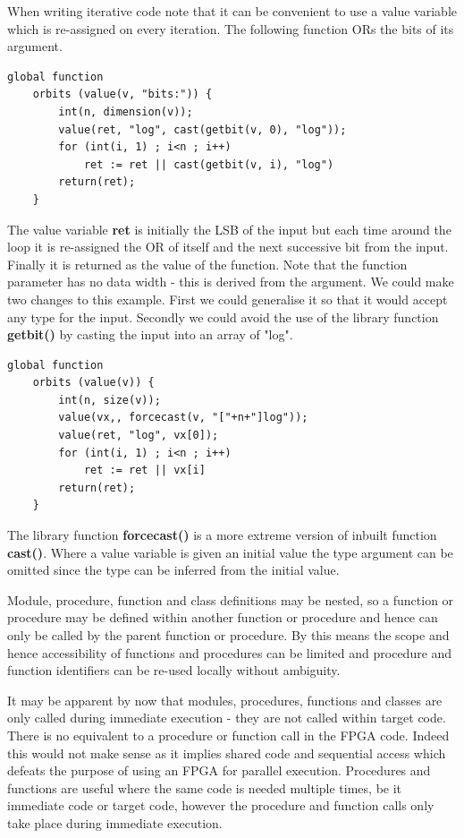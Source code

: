 \documentclass[10pt,a4paper,twoside,fleqn]{article}
\newcommand{\var}[1]{{\bf #1}} %
\begin{document}
    When writing iterative code note that it can be convenient to
    use a value variable which is re-assigned on every iteration. The following
    function ORs the bits of its argument.
    \begin{lstlisting}[language=threepl]
    global function
    orbits (value(v, "bits:")) {
        int(n, dimension(v));
        value(ret, "log", cast(getbit(v, 0), "log"));
        for (int(i, 1) ; i<n ; i++)
            ret := ret || cast(getbit(v, i), "log")
        return(ret);
    }
    \end{lstlisting}
    The value variable \var{ret} is initially the LSB of the input but each time
    around the loop it is re-assigned the OR of itself and the next successive bit
    from the input. Finally it is returned as the value of the function. Note that
    the function parameter has no data width - this is derived from the
    argument. We could make two changes to this example. First we could generalise
    it so that it would accept any type for the input. Secondly we could
    avoid the use of the library function \var{getbit()} by casting the input
    into an array of "log".
    \begin{lstlisting}[language=threepl]
    global function
    orbits (value(v)) {
        int(n, size(v));
        value(vx,, forcecast(v, "["+n+"]log"));
        value(ret, "log", vx[0]);
        for (int(i, 1) ; i<n ; i++)
            ret := ret || vx[i]
        return(ret);
    }
    \end{lstlisting}
    The library function \var{forcecast()} is a more extreme version of inbuilt
    function \var{cast()}.
    Where a value variable is given an initial value the type argument can be
    omitted since the type can be inferred from the initial value.
    
    Module, procedure, function and class definitions may be nested, so a function or
    procedure may be defined within another function or procedure and hence can
    only be called by the parent function or procedure. By this means the scope and
    hence accessibility of functions and procedures can be limited and procedure
    and function identifiers can be re-used locally without ambiguity.
    
    It may be apparent by now that modules, procedures, functions and classes are only
    called during immediate execution - they are not called within target code. There
    is no equivalent to a procedure or function call in the FPGA code. Indeed this
    would not make sense as it implies shared code and sequential access which defeats
    the purpose of using an FPGA for parallel execution. Procedures and functions are
    useful where the same code is needed multiple times, be it immediate code or target
    code, however the procedure and function calls only take place during immediate
    execution.
    
\end{document}
